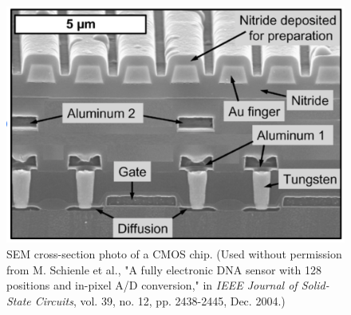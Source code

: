 \begin{figure}[tb]
\centering
\includegraphics[width=.65\columnwidth]{cmos_xsection_photo.png}
\caption{SEM cross-section photo of a CMOS chip. {\small(Used without permission from M. Schienle et al., "A fully electronic DNA sensor with 128 positions and in-pixel A/D conversion," in \emph{IEEE Journal of Solid-State Circuits}, vol. 39, no. 12, pp. 2438-2445, Dec. 2004.)}}
\label{fig:cmos_photo}
\end{figure}
